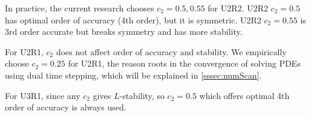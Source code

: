 In practice, the current research chooses $c_2=0.5,0.55$ for U2R2.
U2R2 $c_2=0.5$ has optimal order of accuracy (4th order), but it is symmetric.
U2R2 $c_2=0.55$ is 3rd order accurate but breaks symmetry and has more stability.

For U2R1, $c_2$ does not affect order of accuracy and stability.
We empirically choose $c_2=0.25$ for U2R1, the reason roots in
the convergence of solving PDEs using
dual time stepping, which will be explained in \ref{sssec:numScan}.

For U3R1, since any $c_2$ gives $L$-stability, so $c_2=0.5$ which
offers optimal 4th order of accuracy is always used.








